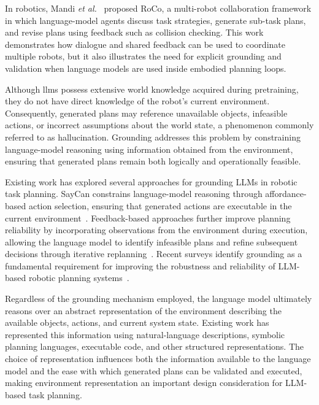 In robotics, Mandi \textit{et al.}~\cite{mandi2024roco} proposed RoCo, a multi-robot collaboration framework in which language-model agents discuss task strategies, generate sub-task plans, and revise plans using feedback such as collision checking. This work demonstrates how dialogue and shared feedback can be used to coordinate multiple robots, but it also illustrates the need for explicit grounding and validation when language models are used inside embodied planning loops.

Although \glspl{llm} possess extensive world knowledge acquired during pretraining, they do not have direct knowledge of the robot's current environment. Consequently, generated plans may reference unavailable objects, infeasible actions, or incorrect assumptions about the world state, a phenomenon commonly referred to as hallucination. Grounding addresses this problem by constraining language-model reasoning using information obtained from the environment, ensuring that generated plans remain both logically and operationally feasible.

Existing work has explored several approaches for grounding LLMs in robotic task planning. SayCan constrains language-model reasoning through affordance-based action selection, ensuring that generated actions are executable in the current environment~\cite{ahn2022do}. Feedback-based approaches further improve planning reliability by incorporating observations from the environment during execution, allowing the language model to identify infeasible plans and refine subsequent decisions through iterative replanning~\cite{huang2022innermonologue,bhat2025closedloopgrounding}. Recent surveys identify grounding as a fundamental requirement for improving the robustness and reliability of LLM-based robotic planning systems~\cite{li2026largelanguagemodelsmultirobot}.

Regardless of the grounding mechanism employed, the language model ultimately reasons over an abstract representation of the environment describing the available objects, actions, and current system state. Existing work has represented this information using natural-language descriptions, symbolic planning languages, executable code, and other structured representations. The choice of representation influences both the information available to the language model and the ease with which generated plans can be validated and executed, making environment representation an important design consideration for LLM-based task planning.


